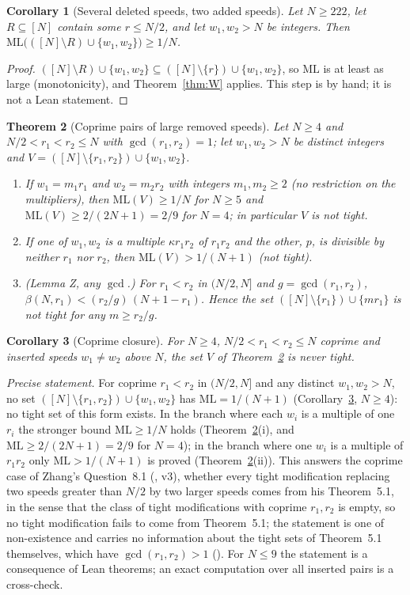 \documentclass[11pt]{article}
\newtheorem{theorem}{Theorem}[section]
\newtheorem{corollary}[theorem]{Corollary}
\theoremstyle{definition}
\theoremstyle{remark}
\newcommand{\ML}{\mathrm{ML}}
\begin{document}
\begin{corollary}[Several deleted speeds, two added speeds]\label{cor:Wmono}
Let $N\ge222$, let $R\subseteq[N]$ contain some $r\le N/2$, and let $w_1,w_2>N$ be integers. Then $\ML\bigl(([N]\setminus R)\cup\{w_1,w_2\}\bigr)\ge1/N$.
\end{corollary}
\begin{proof}
$([N]\setminus R)\cup\{w_1,w_2\}\subseteq([N]\setminus\{r\})\cup\{w_1,w_2\}$, so $\ML$ is at least as large (monotonicity), and Theorem~\ref{thm:W} applies. This step is by hand; it is not a Lean statement.
\end{proof}

\begin{theorem}[Coprime pairs of large removed speeds]\label{thm:Q}
Let $N\ge4$ and $N/2<r_1<r_2\le N$ with $\gcd(r_1,r_2)=1$; let $w_1,w_2>N$ be distinct integers and $V=([N]\setminus\{r_1,r_2\})\cup\{w_1,w_2\}$.
\begin{enumerate}[label=(\roman*),nosep]
\item If $w_1=m_1r_1$ and $w_2=m_2r_2$ with integers $m_1,m_2\ge2$ (no restriction on the multipliers), then $\ML(V)\ge1/N$ for $N\ge5$ and $\ML(V)\ge2/(2N+1)=2/9$ for $N=4$; in particular $V$ is not tight.
\item If one of $w_1,w_2$ is a multiple $\kappa r_1r_2$ of $r_1r_2$ and the other, $p$, is divisible by neither $r_1$ nor $r_2$, then $\ML(V)>1/(N+1)$ (not tight).
\item (Lemma Z, any $\gcd$.) For $r_1<r_2$ in $(N/2,N]$ and $g=\gcd(r_1,r_2)$, $\beta(N,r_1)<(r_2/g)\,(N+1-r_1)$. Hence the set $([N]\setminus\{r_1\})\cup\{mr_1\}$ is not tight for any $m\ge r_2/g$.
\end{enumerate}
\end{theorem}

\begin{corollary}[Coprime closure]\label{cor:Q}
For $N\ge4$, $N/2<r_1<r_2\le N$ coprime and inserted speeds $w_1\ne w_2$ above $N$, the set $V$ of Theorem~\ref{thm:Q} is never tight.
\end{corollary}
\emph{Precise statement.} For coprime $r_1<r_2$ in $(N/2,N]$ and any distinct $w_1,w_2>N$, no set $([N]\setminus\{r_1,r_2\})\cup\{w_1,w_2\}$ has $\ML=1/(N+1)$ (Corollary~\ref{cor:Q}, $N\ge4$): no tight set of this form exists. In the branch where each $w_i$ is a multiple of one $r_i$ the stronger bound $\ML\ge1/N$ holds (Theorem~\ref{thm:Q}(i), and $\ML\ge2/(2N+1)=2/9$ for $N=4$); in the branch where one $w_i$ is a multiple of $r_1r_2$ only $\ML>1/(N+1)$ is proved (Theorem~\ref{thm:Q}(ii)). This answers the coprime case of Zhang's Question~8.1 (\cite{Z}, v3), whether every tight modification replacing two speeds greater than $N/2$ by two larger speeds comes from his Theorem~5.1, in the sense that the class of tight modifications with coprime $r_1,r_2$ is empty, so no tight modification fails to come from Theorem~5.1; the statement is one of non-existence and carries no information about the tight sets of Theorem~5.1 themselves, which have $\gcd(r_1,r_2)>1$ (\cite[Thm.~5.1, Ex.~5.2]{Z}). For $N\le9$ the statement is a consequence of Lean theorems; an exact computation over all inserted pairs is a cross-check.
\end{document}
